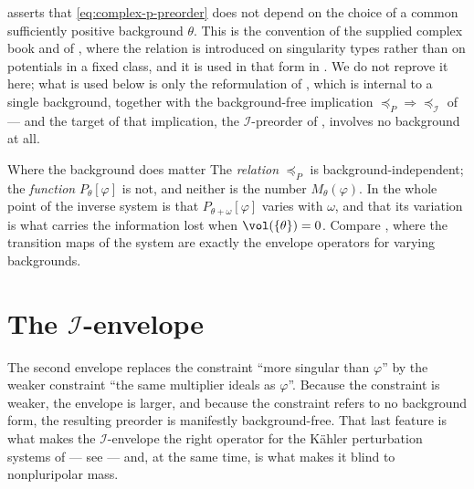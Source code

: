 \begin{remark}
\label{rem:ch51-p-preorder-background}
 asserts that
\eqref{eq:complex-p-preorder} does not depend on the choice of a common
sufficiently positive background \(\theta\).  This is the convention of
the supplied complex book and of \cite{DDNLmetric,DDNLsurv}, where the
relation is introduced on singularity types rather than on potentials in
a fixed class, and it is used in that form in
.  We do not
reprove it here; what is used below is only the reformulation of
, which is internal to a single
background, together with the background-free implication
\(\preceq_P\Rightarrow\preceq_{\mathcal I}\) of
 --- and the target of that
implication, the \(\mathcal I\)-preorder of
, involves no background at all.
\end{remark}

\begin{warning}{Where the background does matter}
\label{warn:ch51-background}
The \emph{relation} \(\preceq_P\) is background-independent; the
\emph{function} \(P_\theta[\varphi]\) is not, and neither is the
number \(M_\theta(\varphi)\).  In
 the whole point of the inverse system
is that \(P_{\theta+\omega}[\varphi]\) varies with \(\omega\), and that
its variation is what carries the information lost when
\(\vol(\{\theta\})=0\).  Compare
, where the transition maps of the
system are exactly the envelope operators for varying backgrounds.
\end{warning}

\section{The \texorpdfstring{\(\mathcal I\)}{I}-envelope}
\label{sec:ch51-i-envelope}

The second envelope replaces the constraint ``more singular than
\(\varphi\)'' by the weaker constraint ``the same multiplier ideals as
\(\varphi\)''.  Because the constraint is weaker, the envelope is larger,
and because the constraint refers to no background form, the resulting
preorder is manifestly background-free.  That last feature is what makes
the \(\mathcal I\)-envelope the right operator for the K\"ahler
perturbation systems of  --- see
 --- and, at the same time, is what
makes it blind to nonpluripolar mass.

